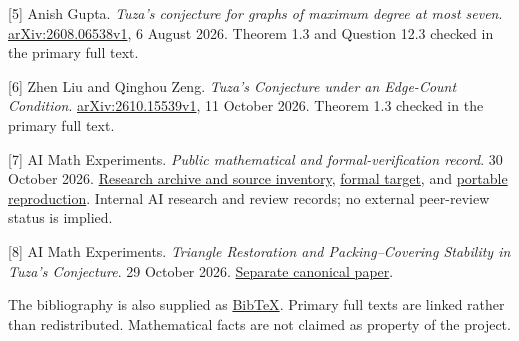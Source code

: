 \documentclass[11pt]{article}
\begin{document}
{[}5{]} Anish Gupta. \emph{Tuza's conjecture for graphs of maximum
degree at most seven}.
\href{https://arxiv.org/abs/2608.06538v1}{arXiv:2608.06538v1}, 6 August
2026. Theorem 1.3 and Question 12.3 checked in the primary full text.

{[}6{]} Zhen Liu and Qinghou Zeng. \emph{Tuza's Conjecture under an
Edge-Count Condition}.
\href{https://arxiv.org/abs/2610.15539v1}{arXiv:2610.15539v1}, 11
October 2026. Theorem 1.3 checked in the primary full text.

{[}7{]} AI Math Experiments. \emph{Public mathematical and
formal-verification record}. 30 October 2026.
\href{https://github.com/pappa211/ai-math-experiments/blob/main/problems/TUZA-06/README.md}{Research archive and source
inventory}, \href{https://github.com/pappa211/ai-math-experiments/blob/main/problems/TUZA-06/FORMAL_STATEMENT.md}{formal
target}, and \href{https://github.com/pappa211/ai-math-experiments/blob/main/problems/TUZA-06/REPRODUCTION.md}{portable
reproduction}. Internal AI research and review records; no external
peer-review status is implied.

{[}8{]} AI Math Experiments. \emph{Triangle Restoration and
Packing--Covering Stability in Tuza's Conjecture}. 29 October 2026.
\href{https://github.com/pappa211/ai-math-experiments/blob/main/papers/tuza-triangle-restoration/main.md}{Separate canonical paper}.

The bibliography is also supplied as \href{https://github.com/pappa211/ai-math-experiments/blob/main/papers/tuza-five-degenerate/references.bib}{BibTeX}.
Primary full texts are linked rather than redistributed. Mathematical
facts are not claimed as property of the project.
\end{document}
